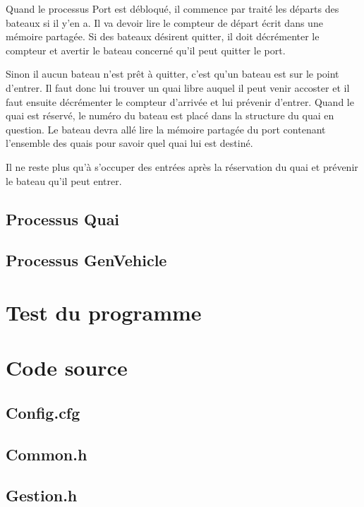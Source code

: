 \documentclass[a4paper, 11pt]{article}
\begin{document}
		Quand le processus Port est débloqué, il commence par traité les départs des bateaux si il y'en a. Il va devoir lire le compteur de départ écrit dans une mémoire partagée. Si des bateaux désirent quitter, il doit décrémenter le compteur et avertir le bateau concerné qu'il peut quitter le port. 
		
		
		Sinon il aucun bateau n'est prêt à quitter, c'est qu'un bateau est sur le point d'entrer. Il faut donc lui trouver un quai libre auquel il peut venir accoster et il faut ensuite décrémenter le compteur d'arrivée et lui prévenir d'entrer. Quand le quai est réservé, le numéro du bateau est placé dans la structure du quai en question. Le bateau devra allé lire la mémoire partagée du port contenant l'ensemble des quais pour savoir quel quai lui est destiné.
		
		
		Il ne reste plus qu'à s'occuper des entrées après la réservation du quai et prévenir le bateau qu'il peut entrer.
			
	\subsection{Processus Quai}
	
	\subsection{Processus GenVehicle}
\section{Test du programme}
\section{Code source}
	\subsection{Config.cfg}
		
	\subsection{Common.h}
		
	\subsection{Gestion.h}
		
\end{document}
